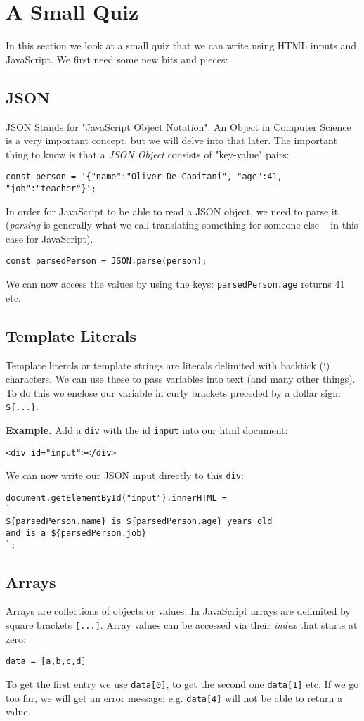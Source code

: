 \documentclass[english,11pt,a4paper]{report}
\begin{document}
\newpage
\section{A Small Quiz}
In this section we look at a small quiz that we can write using HTML inputs and JavaScript. We first need some new bits and pieces:
\subsection{JSON}
JSON Stands for "JavaScript Object Notation". An Object in Computer Science is a very important concept, but we will delve into that later. The important thing to know is that a \emph{JSON Object} consists of "key-value" pairs:
\begin{verbatim}
const person = '{"name":"Oliver De Capitani", "age":41, "job":"teacher"}';
\end{verbatim}
In order for JavaScript to be able to read a JSON object, we need to parse it (\emph{parsing} is generally what we call translating something for someone else -- in this case for JavaScript).
\begin{verbatim}
const parsedPerson = JSON.parse(person);
\end{verbatim}
We can now access the values by using the keys: \verb|parsedPerson.age| returns 41 etc.

\subsection{Template Literals}
Template literals or template strings are literals delimited with backtick (`) characters. We can use these to pass variables into text (and many other things). To do this we enclose our variable in curly brackets preceded by a dollar sign: \verb|${...}|.

{\bf Example.} Add a \verb|div| with the id \verb|input| into our html document:
\begin{verbatim}
<div id="input"></div>
\end{verbatim}
\newpage
We can now write our JSON input directly to this \verb|div|:
\begin{verbatim}
document.getElementById("input").innerHTML = 
`
${parsedPerson.name} is ${parsedPerson.age} years old 
and is a ${parsedPerson.job}
`;
\end{verbatim}

\subsection{Arrays}
Arrays are collections of objects or values. In JavaScript arrays are delimited by square brackets \verb|[...]|. Array values can be accessed via their \emph{index} that starts at zero:
\begin{verbatim}
data = [a,b,c,d]
\end{verbatim}
To get the first entry we use \verb|data[0]|, to get the second one \verb|data[1]| etc. If we go too far, we will get an error message: e.g. \verb|data[4]| will not be able to return a value.
\end{document}
